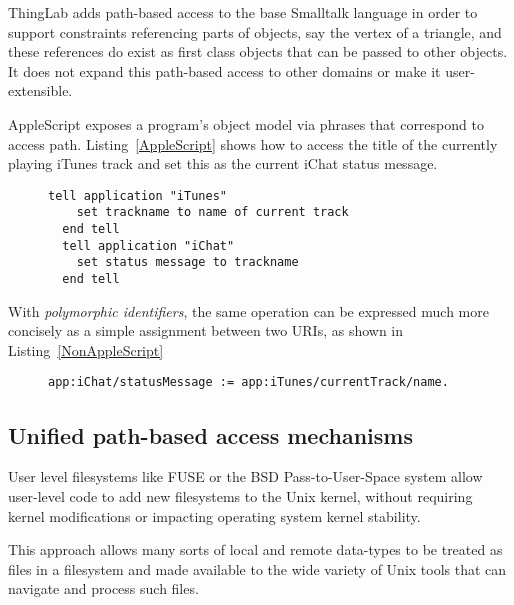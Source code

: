 \documentclass[preprint,authoryear]{acm_proc_article-sp}
\begin{document}
ThingLab\cite{thinglab}  adds path-based access to the base Smalltalk language in order to support
constraints referencing parts of objects, say the vertex of a triangle, and these
references do exist as first class objects that can be passed to other objects.
   It does not
expand this path-based access to other domains or make it user-extensible.

AppleScript\cite{applescript-hopl3} exposes a program's object model via
phrases that correspond to access path.  Listing~\ref{AppleScript} shows 
how to access the title of the currently playing iTunes track and set this
as the current iChat status message.

\begin{figure}[htbp]
\begin{lstlisting}[style=L,label= AppleScript,caption=Using AppleScript to set chat status from track name.]
  tell application "iTunes"
    set trackname to name of current track
  end tell
  tell application "iChat"
    set status message to trackname
  end tell
\end{lstlisting}
\end{figure}

With \emph{polymorphic identifiers}, the same operation can be expressed
much more concisely as a simple assignment between two URIs,
as shown in Listing~\ref{NonAppleScript}


\begin{figure}[htbp]
\begin{lstlisting}[style=L,label=NonAppleScript,caption=Access to applications via \emph{polymorphic identifiers}.]
  app:iChat/statusMessage := app:iTunes/currentTrack/name.
\end{lstlisting}
\end{figure}


\subsection{Unified path-based access mechanisms}


User level filesystems like FUSE\cite{fuse} or the BSD Pass-to-User-Space\cite{puffs} 
system allow
user-level code to add new filesystems to the Unix kernel, without requiring
kernel modifications or impacting operating system kernel stability.

This approach allows many sorts of local and remote data-types to be 
treated as files in a filesystem and made available to the wide variety
of Unix tools that can navigate and process such files.  
\end{document}

